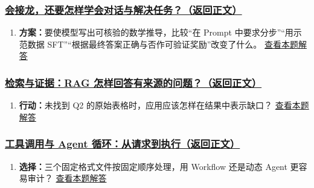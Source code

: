 \subsubsection*{\hyperref[check:23c-post-training]{会接龙，还要怎样学会对话与解决任务？（返回正文）}}\begin{enumerate}[label={},leftmargin=4.8em,itemsep=4pt]
\item[\textbf{C4-36.}] \label{exercise:C4-36}\label{extension:23c-post-training:4}\textbf{方案：}要使模型写出可核验的数学推导，比较“在 Prompt 中要求分步”“用示范数据 SFT”“根据最终答案正确与否作可验证奖励”改变了什么。 \hyperref[answerpiece:23c-post-training:4]{查看本题解答}
\end{enumerate}

\subsubsection*{\hyperref[check:23d-agent-rag]{检索与证据：RAG 怎样回答有来源的问题？（返回正文）}}\begin{enumerate}[label={},leftmargin=4.8em,itemsep=4pt]
\item[\textbf{C4-37.}] \label{exercise:C4-37}\label{extension:23d-agent-rag:4}\textbf{行动：}未找到 Q2 的原始表格时，应用应该怎样在结果中表示缺口？ \hyperref[answerpiece:23d-agent-rag:4]{查看本题解答}
\end{enumerate}

\subsubsection*{\hyperref[check:23d-agent-tools]{工具调用与 Agent 循环：从请求到执行（返回正文）}}\begin{enumerate}[label={},leftmargin=4.8em,itemsep=4pt]
\item[\textbf{C4-38.}] \label{exercise:C4-38}\label{extension:23d-agent-tools:4}\textbf{选择：}三个固定格式文件按固定顺序处理，用 Workflow 还是动态 Agent 更容易审计？ \hyperref[answerpiece:23d-agent-tools:4]{查看本题解答}
\end{enumerate}

